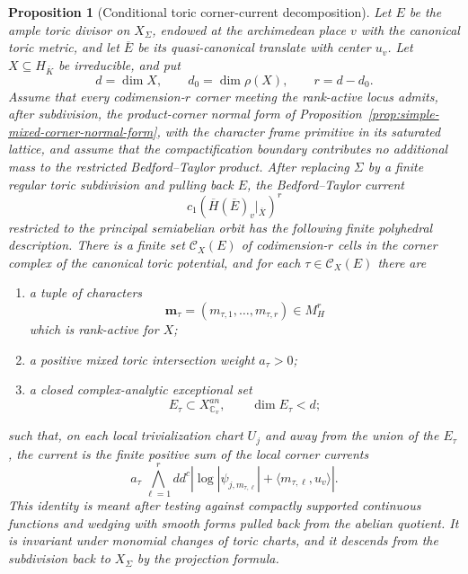 \documentclass[10pt,a4paper]{amsart}
\theoremstyle{plain}
\newtheorem{proposition}[theorem]{Proposition}
\theoremstyle{plain}
\numberwithin{equation}{section}
\providecommand{\bE}{\overline{E}}
\begin{document}
\begin{proposition}[Conditional toric corner-current decomposition]
	\label{prop:toric-corner-current-decomposition}
	\label{input:toric-corner-current-decomposition}
	Let \(E\) be the ample toric divisor on \(X_\Sigma\), endowed at the
	archimedean place \(v\) with the canonical toric metric, and let
	\(\bE\) be its quasi-canonical translate with center \(u_v\).  Let
	\(X\subseteq H_{\overline K}\) be irreducible, and put
	\[
	d=\dim X,\qquad d_0=\dim\rho(X),\qquad r=d-d_0 .
	\]
	Assume that every codimension-\(r\) corner meeting the rank-active locus admits,
	after subdivision, the product-corner normal form of
	Proposition~\ref{prop:simple-mixed-corner-normal-form}, with the character frame
	primitive in its saturated lattice, and assume that the compactification
	boundary contributes no additional mass to the restricted Bedford--Taylor
	product.
	After replacing \(\Sigma\) by a finite regular toric subdivision and pulling
	back \(E\), the Bedford--Taylor current
	\[
	c_1(\overline H(\bE)_v|_{\overline X})^r
	\]
	restricted to the principal semiabelian orbit has the following finite
	polyhedral description.  There is a finite set \(\mathscr C_X(E)\) of
	codimension-\(r\) cells in the corner complex of the canonical toric
	potential, and for each \(\tau\in\mathscr C_X(E)\) there are
	\begin{enumerate}[label=\textup{(\roman*)},leftmargin=2em]
		\item a tuple of characters
		\[
		\mathbf m_\tau=(m_{\tau,1},\ldots,m_{\tau,r})\in M_H^r
		\]
		which is rank-active for \(X\);
		\item a positive mixed toric intersection weight \(a_\tau>0\);
		\item a closed complex-analytic exceptional set
		\[
		E_\tau\subset X^{an}_{\mathbb C_v},\qquad \dim E_\tau<d;
		\]
	\end{enumerate}
	such that, on each local trivialization chart \(U_j\) and away from the union
	of the \(E_\tau\), the current is the finite positive sum of the local corner
	currents
	\[
	a_\tau\,
	\bigwedge_{\ell=1}^r
	dd^c
	\left|
	\log|\psi_{j,m_{\tau,\ell}}|
	+\langle m_{\tau,\ell},u_v\rangle
	\right| .
	\]
	This identity is meant after testing against compactly supported continuous
	functions and wedging with smooth forms pulled back from the abelian quotient.
	It is invariant under monomial changes of toric charts, and it descends from
	the subdivision back to \(X_\Sigma\) by the projection formula.
\end{proposition}
\end{document}
